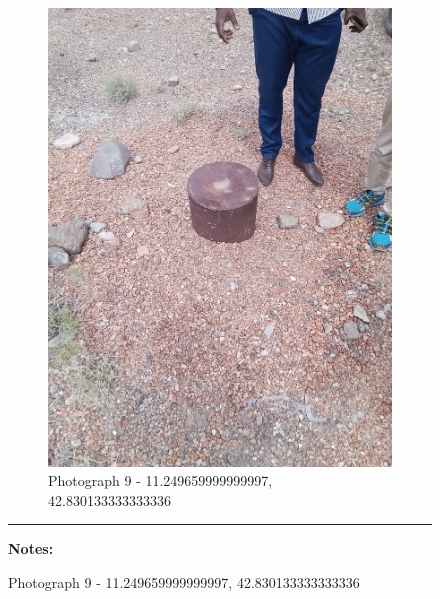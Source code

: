 \documentclass[12pt, letterpaper]{article}
\begin{document}
\begin{figure}[h]
{{                \begin{subfigure}{\linewidth}
                    \centering
                    \includegraphics[width=0.37\textheight, angle=-90]{photos/6.png}
                    \captionsetup{width=0.8\linewidth}
                    \caption{Photograph 9 - 11.249659999999997, 42.830133333333336}
                \end{subfigure}

                    \vspace{\baselineskip}

                    \hrule
                    \begin{minipage}[c][3.5cm][t]{0.4\textwidth} %
                            \begin{minipage}[t][1.5cm][t]{0.4\textwidth} %
                            \vspace{2mm}
                            \hspace{2mm}
                                \raggedright
                                \textbf{\small{Notes:} \footnotesize{}}


\end{minipage}
\end{minipage}}}
\end{figure}
\end{document}
